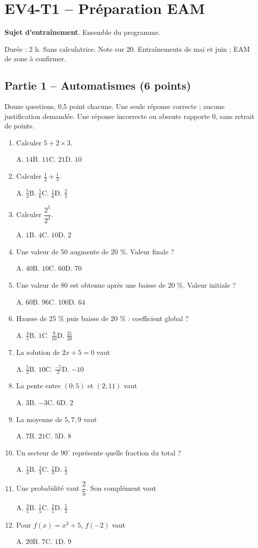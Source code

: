 \clearpage\section*{EV4-T1 -- Préparation EAM}\label{EV4-T1}
\textbf{Sujet d’entraînement}. Ensemble du programme.\par Durée : 2 h. Sans calculatrice. Note sur 20. Entraînements de mai et juin ; EAM de zone à confirmer.
\subsection*{Partie 1 -- Automatismes (6 points)}
Douze questions, 0,5 point chacune. Une seule réponse correcte ; aucune justification demandée. Une réponse incorrecte ou absente rapporte 0, sans retrait de points.
\begin{enumerate}
\item Calculer $5+2\times3$.\par A. $14$\quad B. $11$\quad C. $21$\quad D. $10$
\item Calculer $\frac12+\frac13$.\par A. $\frac{5}{3}$\quad B. $\frac{5}{6}$\quad C. $\frac{1}{6}$\quad D. $\frac{2}{5}$
\item Calculer $\dfrac{2^5}{2^{3}}$.\par A. $1$\quad B. $4$\quad C. $10$\quad D. $2$
\item Une valeur de 50 augmente de 20 \%. Valeur finale ?\par A. $40$\quad B. $10$\quad C. $60$\quad D. $70$
\item Une valeur de 80 est obtenue après une baisse de 20 \%. Valeur initiale ?\par A. $60$\quad B. $96$\quad C. $100$\quad D. $64$
\item Hausse de 25 \% puis baisse de 20 \% : coefficient global ?\par A. $\frac{4}{5}$\quad B. $1$\quad C. $\frac{9}{10}$\quad D. $\frac{21}{20}$
\item La solution de $2x+5=0$ vaut\par A. $\frac{5}{2}$\quad B. $10$\quad C. $\frac{-5}{2}$\quad D. $-10$
\item La pente entre $(0;5)$ et $(2;11)$ vaut\par A. $3$\quad B. $-3$\quad C. $6$\quad D. $2$
\item La moyenne de $5, 7, 9$ vaut\par A. $7$\quad B. $21$\quad C. $5$\quad D. $8$
\item Un secteur de $90^\circ$ représente quelle fraction du total ?\par A. $\frac{1}{4}$\quad B. $\frac{3}{4}$\quad C. $\frac{1}{3}$\quad D. $\frac{1}{2}$
\item Une probabilité vaut $\dfrac{2}{5}$. Son complément vaut\par A. $\frac{3}{5}$\quad B. $\frac{1}{5}$\quad C. $\frac{2}{5}$\quad D. $\frac{5}{2}$
\item Pour $f(x)=x^2+5$, $f(-2)$ vaut\par A. $20$\quad B. $7$\quad C. $1$\quad D. $9$
\end{enumerate}
